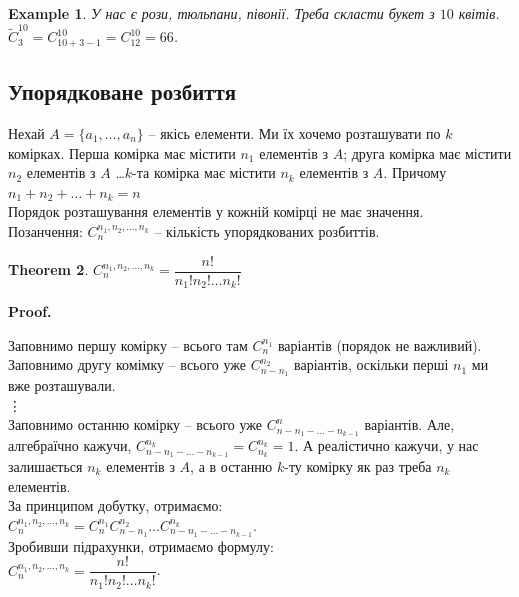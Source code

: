 \documentclass[a4paper, 14pt]{extarticle}
\makeatletter
\theoremstyle{theoremdd}
\newtheorem{theorem}{Theorem}[subsection]
\theoremstyle{theoremdd}
\theoremstyle{theoremdd}
\theoremstyle{theoremdd}
\theoremstyle{theoremdd}
\newtheorem{example}[theorem]{Example}
\theoremstyle{theoremdd}
\theoremstyle{theoremdd}
\theoremstyle{theoremdd}
\theoremstyle{theoremdd}
\theoremstyle{theoremdd}
\theoremstyle{theoremdd}
\theoremstyle{theoremdd}
\theoremstyle{theoremdd}
\theoremstyle{theoremdd}
\theoremstyle{theoremdd}
\renewenvironment{proof}[1][Proof.\\]{\par
\pushQED{\hfill \qed}%
\normalfont \topsep6\p@\@plus6\p@\relax
\trivlist
\item\relax
{\bfseries
#1\@addpunct{.}}\hspace\labelsep\ignorespaces
}{%
\popQED\endtrivlist\@endpefalse
}
\makeatother
\begin{document}
\begin{example}
У нас є рози, тюльпани, півонії. Треба скласти букет з $10$ квітів.\\
$\tilde{C}_3^{10} = C_{10+3-1}^{10} = C_{12}^{10} = 66$.
\end{example}

\subsection{Упорядковане розбиття}
Нехай $A = \{a_1,\dots,a_n\}$ -- якісь елементи. Ми їх хочемо розташувати по $k$ комірках. Перша комірка має містити $n_1$ елементів з $A$; друга комірка має містити $n_2$ елементів з $A$ \dots $k$-та комірка має містити $n_k$ елементів з $A$. Причому $n_1 + n_2 + \dots + n_k = n$\\
Порядок розташування елементів у кожній комірці не має значення.\\
Позанчення: $C_{n}^{n_1,n_2,\dots,n_k}$ -- кількість упорядкованих розбиттів.

\begin{theorem}
$C_n^{n_1,n_2,\dots,n_k} = \dfrac{n!}{n_1! n_2! \dots n_k!}$
\end{theorem}

\begin{proof}
Заповнимо першу комірку -- всього там $C_n^{n_1}$ варіантів (порядок не важливий).\\
Заповнимо другу комімку -- всього уже $C_{n-n_1}^{n_2}$ варіантів, оскільки перші $n_1$ ми вже розташували.\\
\vdots \\
Заповнимо останню комірку -- всього уже $C_{n-n_1-\dots-n_{k-1}}^n$ варіантів. Але, алгебраїчно кажучи, $C_{n-n_1-\dots-n_{k-1}}^{n_k} = C_{n_k}^{n_k} = 1$. А реалістично кажучи, у нас залишається $n_k$ елементів з $A$, а в останню $k$-ту комірку як раз треба $n_k$ елементів.\\
За принципом добутку, отримаємо:\\
$C_n^{n_1,n_2,\dots,n_k} = C_n^{n_1} C_{n-n_1}^{n_2} \dots C_{n-n_1-\dots-n_{k-1}}^{n_k}$.\\
Зробивши підрахунки, отримаємо формулу:\\
$C_n^{n_1,n_2,\dots,n_k} = \dfrac{n!}{n_1! n_2! \dots n_k!}$.
\end{proof}
\end{document}

